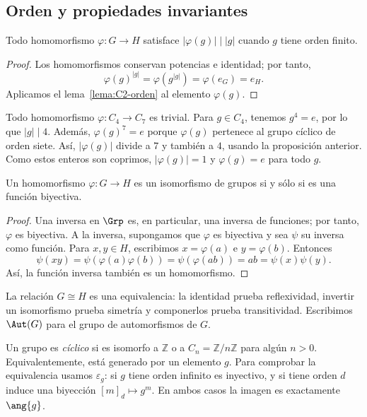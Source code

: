 \subsection{Orden y propiedades invariantes}
\begin{prop}\label{prop:C3-orden-imagen}
Todo homomorfismo $\varphi:G\to H$ satisface $|\varphi(g)|\mid |g|$ cuando $g$ tiene orden finito.
\end{prop}
\begin{proof}
Los homomorfismos conservan potencias e identidad; por tanto,
\[
\varphi(g)^{|g|}=\varphi(g^{|g|})=\varphi(e_G)=e_H.
\]
Aplicamos el lema~\ref{lema:C2-orden} al elemento $\varphi(g)$.
\end{proof}
\begin{ejem}
Todo homomorfismo $\varphi:C_4\to C_7$ es trivial. Para $g\in C_4$, tenemos $g^4=e$, por lo que $|g|\mid4$. Además, $\varphi(g)^7=e$ porque $\varphi(g)$ pertenece al grupo cíclico de orden siete. Así, $|\varphi(g)|$ divide a $7$ y también a $4$, usando la proposición anterior. Como estos enteros son coprimos, $|\varphi(g)|=1$ y $\varphi(g)=e$ para todo $g$.
\end{ejem}

\begin{prop}\label{prop:C3-iso}
Un homomorfismo $\varphi:G\to H$ es un isomorfismo de grupos si y sólo si es una función biyectiva.
\end{prop}
\begin{proof}
Una inversa en $\Grp$ es, en particular, una inversa de funciones; por tanto, $\varphi$ es biyectiva. A la inversa, supongamos que $\varphi$ es biyectiva y sea $\psi$ su inversa como función. Para $x,y\in H$, escribimos $x=\varphi(a)$ e $y=\varphi(b)$. Entonces
\[
\psi(xy)=\psi(\varphi(a)\varphi(b))
=\psi(\varphi(ab))=ab=\psi(x)\psi(y).
\]
Así, la función inversa también es un homomorfismo.
\end{proof}
La relación $G\cong H$ es una equivalencia: la identidad prueba reflexividad, invertir un isomorfismo prueba simetría y componerlos prueba transitividad. Escribimos $\Aut(G)$ para el grupo de automorfismos de $G$.

Un grupo es \emph{cíclico} si es isomorfo a $\mathbb Z$ o a $C_n=\mathbb Z/n\mathbb Z$ para algún $n>0$. Equivalentemente, está generado por un elemento $g$. Para comprobar la equivalencia usamos $\varepsilon_g$: si $g$ tiene orden infinito es inyectivo, y si tiene orden $d$ induce una biyección $[m]_d\mapsto g^m$. En ambos casos la imagen es exactamente $\ang{g}$.

